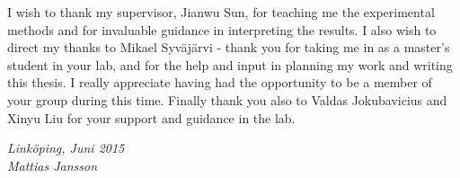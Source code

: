\begin{acknowledgments}
  I wish to thank my supervisor, Jianwu Sun, for teaching me the experimental methods and for invaluable guidance in interpreting the results. I also wish to direct my thanks to Mikael Syväjärvi - thank you for taking me in as a master's student in your lab, and for the help and input in planning my work and writing this thesis. I really appreciate having had the opportunity to be a member of your group during this time. Finally thank you also to Valdas Jokubavicius and Xinyu Liu for your support and guidance in the lab. 

  \addvspace{1em}
  \begin{flushright}
    \textit{%
      Linköping, Juni 2015\\
      Mattias Jansson%
    }
  \end{flushright}
\end{acknowledgments}
